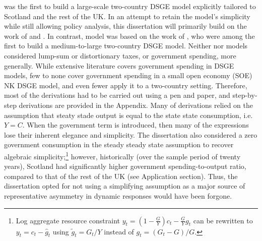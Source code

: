 \textcite{ricci_2019_essays} was the first to build a large-scale two-country DSGE model explicitly tailored to Scotland and the rest of the UK. In an attempt to retain the model's simplicity while still allowing policy analysis, this dissertation will primarily build on the work of \textcite{gali_2005_monetary} and \textcite{jordigal_2015_monetary}. In contrast, \textcite{ricci_2019_essays} model was based on the work of \textcite{rabanal_2010_eurodollar}, who were among the first to build a medium-to-large two-country DSGE model. Neither \textcite{gali_2005_monetary} nor \textcite{jordigal_2015_monetary} models considered lump-sum or distortionary taxes, or government spending, more generally. While extensive literature covers government spending in DSGE models, few to none cover government spending in a small open economy (SOE) NK DSGE model, and even fewer apply it to a two-country setting. Therefore, most of the derivations had to be carried out using a pen and paper, and step-by-step derivations are provided in the Appendix. Many of \textcite{jordigal_2015_monetary} derivations relied on the assumption that steaty stade output is equal to the state state consumption, i.e. $Y=C$. When the government term is introduced, then many of the expressions lose their inherent elegance and simplicity. The dissertation also considered a zero government consumption in the steady steady state assumption to recover algebraic simplicity;\enlargethispage{\baselineskip}\footnote{Log aggregate resource constraint $y_t = \left( 1 - \frac{G}{Y}\right)c_t - \frac{G}{Y}g_t$ can be rewritten to $y_t = c_t - \hat{g}_t$ using $\tilde{g}_t = G_t/Y$ instead of $g_t = (G_t - G)/G$.} however, historically (over the sample period of twenty years), Scotland had significantly higher government spending-to-output ratio, compared to that of the rest of the UK (see Application section). Thus, the dissertation opted for not using a simplifying assumption as a major source of representative asymmetry in dynamic responses would have been forgone.

